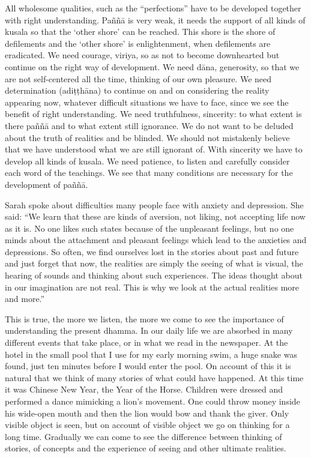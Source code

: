All wholesome qualities, such as the ``perfections'' have to be
developed together with right understanding. Paññā is very weak, it
needs the support of all kinds of kusala so that the `other shore' can
be reached. This shore is the shore of defilements and the `other shore'
is enlightenment, when defilements are eradicated. We need courage,
viriya, so as not to become downhearted but continue on the right way of
development. We need dāna, generosity, so that we are not self-centered
all the time, thinking of our own pleasure. We need determination
(adiṭṭhāna) to continue on and on considering the reality appearing now,
whatever difficult situations we have to face, since we see the benefit
of right understanding. We need truthfulness, sincerity: to what extent
is there paññā and to what extent still ignorance. We do not want to be
deluded about the truth of realities and be blinded. We should not
mistakenly believe that we have understood what we are still ignorant
of. With sincerity we have to develop all kinds of kusala. We need
patience, to listen and carefully consider each word of the teachings.
We see that many conditions are necessary for the development of paññā.

Sarah spoke about difficulties many people face with anxiety and
depression. She said: ``We learn that these are kinds of aversion, not
liking, not accepting life now as it is. No one likes such states
because of the unpleasant feelings, but no one minds about the
attachment and pleasant feelings which lead to the anxieties and
depressions. So often, we find ourselves lost in the stories about past
and future and just forget that now, the realities are simply the seeing
of what is visual, the hearing of sounds and thinking about such
experiences. The ideas thought about in our imagination are not real.
This is why we look at the actual realities more and more.''

This is true, the more we listen, the more we come to see the importance
of understanding the present dhamma. In our daily life we are absorbed
in many different events that take place, or in what we read in the
newspaper. At the hotel in the small pool that I use for my early
morning swim, a huge snake was found, just ten minutes before I would
enter the pool. On account of this it is natural that we think of many
stories of what could have happened. At this time it was Chinese New
Year, the Year of the Horse. Children were dressed and performed a dance
mimicking a lion's movement. One could throw money inside his wide-open
mouth and then the lion would bow and thank the giver. Only visible
object is seen, but on account of visible object we go on thinking for a
long time. Gradually we can come to see the difference between thinking
of stories, of concepts and the experience of seeing and other ultimate
realities.

